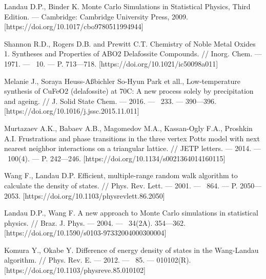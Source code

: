 \begin{thebibliography}{11}
Landau D.P., Binder K. Monte Carlo Simulations in Statistical Physics, Third Edition. --- Cambridge: Cambridge University Press, 2009. [https://doi.org/10.1017/cbo9780511994944]



Shannon R.D., Rogers D.B. and Prewitt C.T. Chemistry of Noble Metal Oxides 1. Syntheses and Properties of ABO2 Delafossite Compounds. // Inorg. Chem. --- 1971. --- \No\ 10. --- P. 713--–718. [https://doi.org/10.1021/ic50098a011]



Melanie J., Soraya Heuss-Aßbichler So-Hyun Park et all., Low-temperature synthesis of CuFeO2 (delafossite) at 70C: A new process solely by precipitation and ageing. // J. Solid State Chem. --- 2016. --- \No\ 233. --- 390---396. [https://doi.org/10.1016/j.jssc.2015.11.011]



Murtazaev A.K., Babaev A.B., Magomedov M.A., Kassan-Ogly F.A., Proshkin A.I. Frustrations and phase transitions in the three vertex Potts model with next nearest neighbor interactions on a triangular lattice. // JETP letters. --- 2014. --- \No\ 100(4). --- P. 242---246. [https://doi.org/10.1134/s0021364014160115]



Wang F., Landau D.P. Efficient, multiple-range random walk algorithm to calculate the density of states. // Phys. Rev. Lett. --- 2001. --- \No\ 864. --- P. 2050---2053. [https://doi.org/10.1103/physrevlett.86.2050]



Landau D.P., Wang F. A new approach to Monte Carlo simulations in statistical physics. // Braz. J. Phys. --- 2004. --- \No\ 34(2A). 354---362. [https://doi.org/10.1590/s0103-97332004000300004]



Komura Y., Okabe Y. Difference of energy density of states in the Wang-Landau algorithm. // Phys. Rev. E. --- 2012. --- \No\ 85. --- 010102(R). [https://doi.org/10.1103/physreve.85.010102]









\end{thebibliography}
